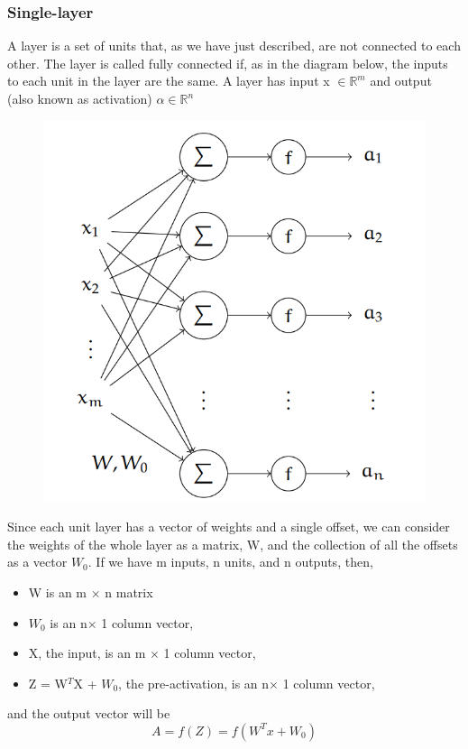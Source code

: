 \subsubsection{Single-layer}
A layer is a set of units that, as we have just described, are not connected to each other. The
layer is called fully connected if, as in the diagram below, the inputs to each unit in the layer
are the same. A layer has input x $\in \mathbb{R}^m$ and output (also known as activation) $\alpha \in \mathbb{R}^n$
\begin{figure}[H]
    \centering
    \includegraphics[scale=0.3]{Figures/ml_2.png}
    \label{fig:my_label}
\end{figure}
Since each unit layer has a vector of weights and a single offset, we can consider the weights of
the whole layer as a matrix, W, and the collection of all the offsets as a vector $W_0$. If we
have m inputs, n units, and n outputs, then,
\begin{itemize}
    \item  W is an m $\times$ n matrix
     \item $W_0$ is an n$\times$  1 column vector,
     \item X, the input, is an m $\times$  1 column vector,
     \item Z = W$^T$X + $W_0$, the pre-activation, is an n$\times$  1 column vector,
\end{itemize}
and the output vector will be\\
\begin{equation*}
    A = f(Z) = f(W^Tx +W_0)
\end{equation*}

